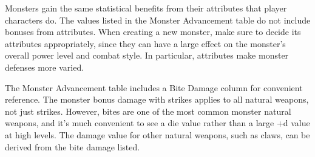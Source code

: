         Monsters gain the same statistical benefits from their attributes that player characters do.
        The values listed in the Monster Advancement table do not include bonuses from attributes.
        When creating a new monster, make sure to decide its attributes appropriately, since they can have a large effect on the monster's overall power level and combat style.
        In particular, attributes make monster defenses more varied.

        The Monster Advancement table includes a Bite Damage column for convenient reference.
        The monster bonus damage with strikes applies to all natural weapons, not just strikes.
        However, bites are one of the most common monster natural weapons, and it's much convenient to see a die value rather than a large +d value at high levels.
        The damage value for other natural weapons, such as claws, can be derived from the bite damage listed.

